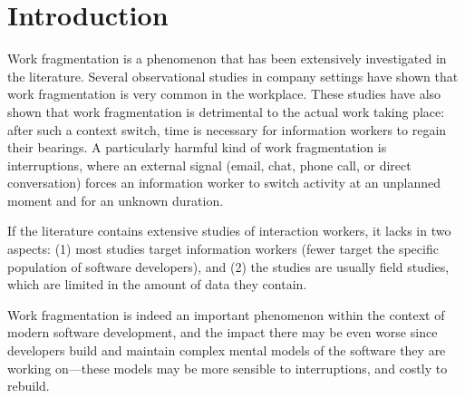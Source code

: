 \documentclass[times]{smrauth}
\begin{document}
\section{Introduction}
% 
% 
% 
% 

Work fragmentation is a phenomenon that has been extensively investigated in the literature. Several observational studies in company settings have shown that work fragmentation is very common in the workplace. These studies have also shown that work fragmentation is detrimental to the actual work taking place: after such a context switch, time is necessary for information workers to regain their bearings. A particularly harmful kind of work fragmentation is interruptions, where an external signal (email, chat, phone call, or direct conversation) forces an information worker to switch activity at an unplanned moment and for an unknown duration.

If the literature contains extensive studies of interaction workers, it lacks in two aspects: (1) most studies target information workers (fewer target the specific population of software developers), and (2) the studies are usually field studies, which are limited in the amount of data they contain.

Work fragmentation is indeed an important phenomenon within the context of modern software development, and the impact there may be even worse since developers build and maintain complex mental models of the software they are working on---these models may be more sensible to interruptions, and costly to rebuild. %
\end{document}
